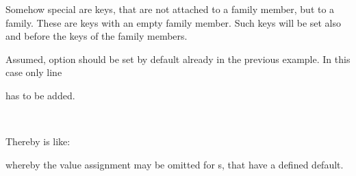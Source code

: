 Somehow special are keys, that are not attached to a family member, but to a
family. These are keys with an empty family member. Such keys will be set also
and before the keys of the family members.
\begin{Example}
  Assumed, option  should be set by default already in the
  previous example. In this case only line
\begin{lstcode}
\end{lstcode}
  has to be added.
\end{Example}
%
%


\begin{Declaration}
  \\
\end{Declaration}
%
%
Thereby  is like:
whereby the value assignment may be omitted for s, that have a
defined default.

